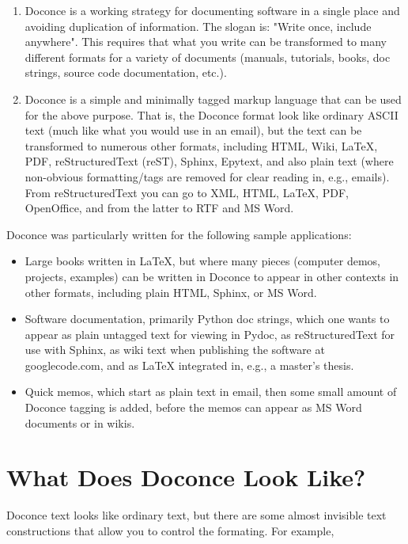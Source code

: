 \documentclass{article}
\begin{document}
\begin{enumerate}
 \item Doconce is a working strategy for documenting software in a single
    place and avoiding duplication of information. The slogan is:
    "Write once, include anywhere". This requires that what you write
    can be transformed to many different formats for a variety of
    documents (manuals, tutorials, books, doc strings, source code
    documentation, etc.).
 \item Doconce is a simple and minimally tagged markup language that can
    be used for the above purpose. That is, the Doconce format look
    like ordinary ASCII text (much like what you would use in an
    email), but the text can be transformed to numerous other formats,
    including HTML, Wiki, {\LaTeX}, PDF, reStructuredText (reST), Sphinx,
    Epytext, and also plain text (where non-obvious formatting/tags are
    removed for clear reading in, e.g., emails). From reStructuredText
    you can go to XML, HTML, {\LaTeX}, PDF, OpenOffice, and from the
    latter to RTF and MS Word.
\end{enumerate}
Doconce was particularly written for the following sample applications:

\begin{itemize}
  \item Large books written in {\LaTeX}, but where many pieces (computer demos,
    projects, examples) can be written in Doconce to appear in other
    contexts in other formats, including plain HTML, Sphinx, or MS Word.
  \item Software documentation, primarily Python doc strings, which one wants
    to appear as plain untagged text for viewing in Pydoc, as reStructuredText
    for use with Sphinx, as wiki text when publishing the software at
    googlecode.com, and as {\LaTeX} integrated in, e.g., a master's thesis.
  \item Quick memos, which start as plain text in email, then some small
    amount of Doconce tagging is added, before the memos can appear as
    MS Word documents or in wikis.
\end{itemize}


\section{What Does Doconce Look Like?}

Doconce text looks like ordinary text, but there are some almost invisible
text constructions that allow you to control the formating. For example,
\end{document}
